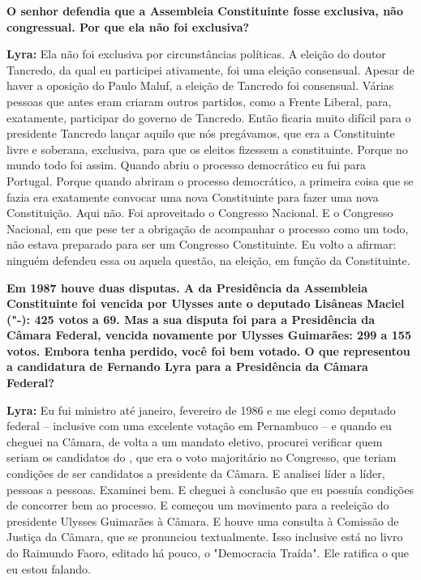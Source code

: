 \textbf{O senhor defendia que a Assembleia Constituinte fosse exclusiva,
não congressual. Por que ela não foi exclusiva?}

\textbf{Lyra:} Ela não foi exclusiva por circunstâncias políticas. A
eleição do doutor Tancredo, da qual eu participei ativamente, foi uma
eleição consensual. Apesar de haver a oposição do Paulo Maluf, a eleição
de Tancredo foi consensual. Várias pessoas que antes eram  criaram
outros partidos, como a Frente Liberal, para, exatamente, participar do
governo de Tancredo. Então ficaria muito difícil para o presidente
Tancredo lançar aquilo que nós pregávamos, que era a Constituinte livre
e soberana, exclusiva, para que os eleitos fizessem a constituinte.
Porque no mundo todo foi assim. Quando abriu o processo democrático eu
fui para Portugal. Porque quando abriram o processo democrático, a
primeira coisa que se fazia era exatamente convocar uma nova
Constituinte para fazer uma nova Constituição. Aqui não. Foi aproveitado
o Congresso Nacional. E o Congresso Nacional, em que pese ter a
obrigação de acompanhar o processo como um todo, não estava preparado
para ser um Congresso Constituinte. Eu volto a afirmar: ninguém defendeu
essa ou aquela questão, na eleição, em função da Constituinte.

\textbf{Em 1987 houve duas disputas. A da Presidência da Assembleia
Constituinte foi vencida por Ulysses ante o deputado Lisâneas Maciel
("-): 425 votos a 69. Mas a sua disputa foi para a Presidência da
Câmara Federal, vencida novamente por Ulysses Guimarães: 299 a 155
votos. Embora tenha perdido, você foi bem votado. O que representou a
candidatura de Fernando Lyra para a Presidência da Câmara Federal?}

\textbf{Lyra:} Eu fui ministro até janeiro, fevereiro de 1986 e me elegi
como deputado federal -- inclusive com uma excelente votação em
Pernambuco -- e quando eu cheguei na Câmara, de volta a um mandato
eletivo, procurei verificar quem seriam os candidatos do , que era o
voto majoritário no Congresso, que teriam condições de ser candidatos a
presidente da Câmara. E analisei líder a líder, pessoas a pessoas.
Examinei bem. E cheguei à conclusão que eu possuía condições de
concorrer bem ao processo. E começou um movimento para a reeleição do
presidente Ulysses Guimarães à Câmara. E houve uma consulta à Comissão
de Justiça da Câmara, que se pronunciou textualmente. Isso inclusive
está no livro do Raimundo Faoro, editado há pouco, o "Democracia
Traída". Ele ratifica o que eu estou falando.


